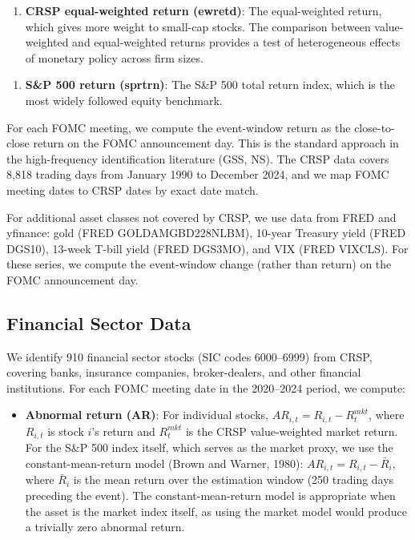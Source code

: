 \documentclass[12pt]{article}
\begin{document}
\begin{enumerate}
\item \textbf{CRSP equal-weighted return (ewretd)}: The equal-weighted return, which gives more weight to small-cap stocks. The comparison between value-weighted and equal-weighted returns provides a test of heterogeneous effects of monetary policy across firm sizes.
\end{enumerate}

\begin{enumerate}
\item \textbf{S\&P 500 return (sprtrn)}: The S\&P 500 total return index, which is the most widely followed equity benchmark.
\end{enumerate}

For each FOMC meeting, we compute the event-window return as the close-to-close return on the FOMC announcement day. This is the standard approach in the high-frequency identification literature (GSS, NS). The CRSP data covers 8,818 trading days from January 1990 to December 2024, and we map FOMC meeting dates to CRSP dates by exact date match.

For additional asset classes not covered by CRSP, we use data from FRED and yfinance: gold (FRED GOLDAMGBD228NLBM), 10-year Treasury yield (FRED DGS10), 13-week T-bill yield (FRED DGS3MO), and VIX (FRED VIXCLS). For these series, we compute the event-window change (rather than return) on the FOMC announcement day.

\subsection{Financial Sector Data}

We identify 910 financial sector stocks (SIC codes 6000--6999) from CRSP, covering banks, insurance companies, broker-dealers, and other financial institutions. For each FOMC meeting date in the 2020--2024 period, we compute:

\begin{itemize}
\item \textbf{Abnormal return (AR)}: For individual stocks, $AR_{i,t} = R_{i,t} - R^{mkt}_t$, where $R_{i,t}$ is stock $i$'s return and $R^{mkt}_t$ is the CRSP value-weighted market return. For the S\&P 500 index itself, which serves as the market proxy, we use the constant-mean-return model (Brown and Warner, 1980): $AR_{i,t} = R_{i,t} - \bar{R}_i$, where $\bar{R}_i$ is the mean return over the estimation window (250 trading days preceding the event). The constant-mean-return model is appropriate when the asset is the market index itself, as using the market model would produce a trivially zero abnormal return.
\end{itemize}
\end{document}

